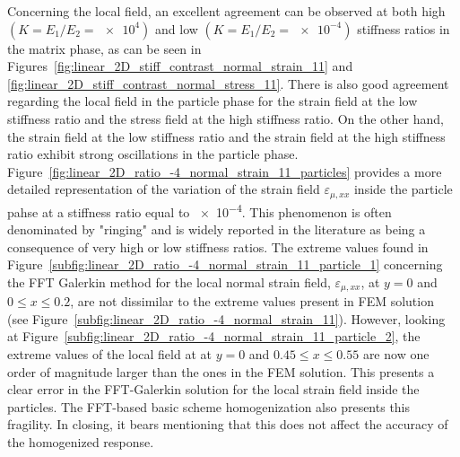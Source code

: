 Concerning the local field, an excellent agreement can be observed at both high \((K=E_1/E_2=\num{e4})\) and low \((K=E_1/E_2=\num{e-4})\) stiffness ratios in the matrix phase, as can be seen in Figures~\ref{fig:linear_2D_stiff_contrast_normal_strain_11} and \ref{fig:linear_2D_stiff_contrast_normal_stress_11}.
There is also good agreement regarding the local field in the particle phase for the strain field at the low stiffness ratio and the stress field at the high stiffness ratio.
On the other hand, the strain field at the low stiffness ratio and the strain field at the high stiffness ratio exhibit strong oscillations in the particle phase.
Figure~\ref{fig:linear_2D_ratio_-4_normal_strain_11_particles} provides a more detailed representation of the variation of the strain field \(\varepsilon_{\mu,xx}\) inside the particle pahse at a stiffness ratio equal to \num{e-4}.
This phenomenon is often denominated by "ringing" and is widely reported in the literature as being a consequence of very high or low stiffness ratios.
The extreme values found in Figure~\ref{subfig:linear_2D_ratio_-4_normal_strain_11_particle_1} concerning the FFT Galerkin method for the local normal strain field, \(\varepsilon_{\mu,xx}\), at \(y=0\) and \(0\leq x\leq 0.2\), are not dissimilar to the extreme values present in FEM solution (see Figure~\ref{subfig:linear_2D_ratio_-4_normal_strain_11}).
However, looking at Figure~\ref{subfig:linear_2D_ratio_-4_normal_strain_11_particle_2}, the extreme values of the local field at at \(y=0\) and \(0.45 \leq x\leq 0.55\) are now one order of magnitude larger than the ones in the FEM solution.
This presents a clear error in the FFT-Galerkin solution for the local strain field inside the particles.
The FFT-based basic scheme homogenization also presents this fragility.
In closing, it bears mentioning that this does not affect the accuracy of the homogenized response.


